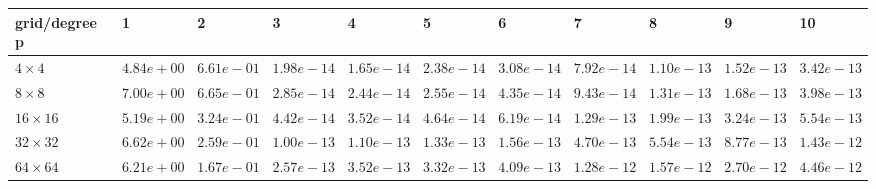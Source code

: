 \begin{tabular}{lllllllllll}
\hline
 grid/degree p   & 1          & 2          & 3          & 4          & 5          & 6          & 7          & 8          & 9          & 10         \\
\hline
 $4 \times 4$    & $4.84e+00$ & $6.61e-01$ & $1.98e-14$ & $1.65e-14$ & $2.38e-14$ & $3.08e-14$ & $7.92e-14$ & $1.10e-13$ & $1.52e-13$ & $3.42e-13$ \\
 $8 \times 8$    & $7.00e+00$ & $6.65e-01$ & $2.85e-14$ & $2.44e-14$ & $2.55e-14$ & $4.35e-14$ & $9.43e-14$ & $1.31e-13$ & $1.68e-13$ & $3.98e-13$ \\
 $16 \times 16$  & $5.19e+00$ & $3.24e-01$ & $4.42e-14$ & $3.52e-14$ & $4.64e-14$ & $6.19e-14$ & $1.29e-13$ & $1.99e-13$ & $3.24e-13$ & $5.54e-13$ \\
 $32 \times 32$  & $6.62e+00$ & $2.59e-01$ & $1.00e-13$ & $1.10e-13$ & $1.33e-13$ & $1.56e-13$ & $4.70e-13$ & $5.54e-13$ & $8.77e-13$ & $1.43e-12$ \\
 $64 \times 64$  & $6.21e+00$ & $1.67e-01$ & $2.57e-13$ & $3.52e-13$ & $3.32e-13$ & $4.09e-13$ & $1.28e-12$ & $1.57e-12$ & $2.70e-12$ & $4.46e-12$ \\
\hline
\end{tabular}